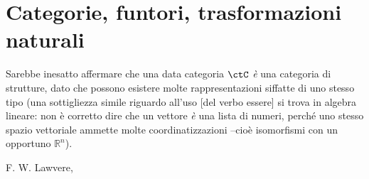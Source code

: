 \chapter{Categorie, funtori, trasformazioni naturali}\label{chap_cat_fun_nat}
\epigraph{
Sarebbe inesatto affermare che una data categoria \(\ctC\) \emph{è} una categoria di strutture, dato che possono esistere molte rappresentazioni siffatte di uno stesso tipo (una sottigliezza simile riguardo all'uso [del verbo essere] si trova in algebra lineare: non è corretto dire che un vettore \emph{è} una lista di numeri, perché uno stesso spazio vettoriale ammette molte coordinatizzazioni --cioè isomorfismi con un opportuno \(\mathbb{R}^n\)).
}{F. W. Lawvere, \cite{}}








